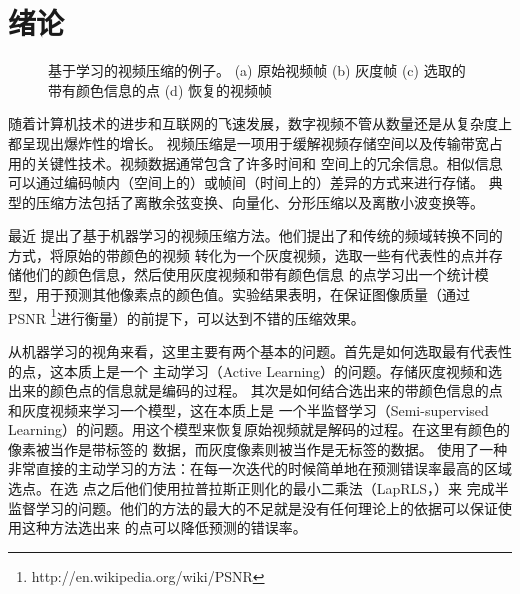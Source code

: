 \chapter{绪论}

\begin{figure}
\caption{\label{fig:cycle}基于学习的视频压缩的例子。 (a) 原始视频帧
(b) 灰度帧 (c) 选取的带有颜色信息的点 (d) 恢复的视频帧}
\end{figure}

随着计算机技术的进步和互联网的飞速发展，数字视频不管从数量还是从复杂度上都呈现出爆炸性的增长。
视频压缩是一项用于缓解视频存储空间以及传输带宽占用的关键性技术。视频数据通常包含了许多时间和
空间上的冗余信息。相似信息可以通过编码帧内（空间上的）或帧间（时间上的）差异的方式来进行存储。
典型的压缩方法包括了离散余弦变换、向量化、分形压缩以及离散小波变换等。

最近 \cite{learning-to-compress-images}
提出了基于机器学习的视频压缩方法。他们提出了和传统的频域转换不同的方式，将原始的带颜色的视频
转化为一个灰度视频，选取一些有代表性的点并存储他们的颜色信息，然后使用灰度视频和带有颜色信息
的点学习出一个统计模型，用于预测其他像素点的颜色值。实验结果表明，在保证图像质量（通过
PSNR
\footnote{http://en.wikipedia.org/wiki/PSNR}进行衡量）的前提下，可以达到不错的压缩效果。

从机器学习的视角来看，这里主要有两个基本的问题。首先是如何选取最有代表性的点，这本质上是一个
主动学习（Active
Learning）的问题。存储灰度视频和选出来的颜色点的信息就是编码的过程。
其次是如何结合选出来的带颜色信息的点和灰度视频来学习一个模型，这在本质上是
一个半监督学习（Semi-supervised
Learning）的问题。用这个模型来恢复原始视频就是解码的过程。在这里有颜色的像素被当作是带标签的
数据，而灰度像素则被当作是无标签的数据。\cite{learning-to-compress-images}
使用了一种非常直接的主动学习的方法：在每一次迭代的时候简单地在预测错误率最高的区域选点。在选
点之后他们使用拉普拉斯正则化的最小二乘法（LapRLS，\cite{Manifold-Regularization-Journal}）来
完成半监督学习的问题。他们的方法的最大的不足就是没有任何理论上的依据可以保证使用这种方法选出来
的点可以降低预测的错误率。

